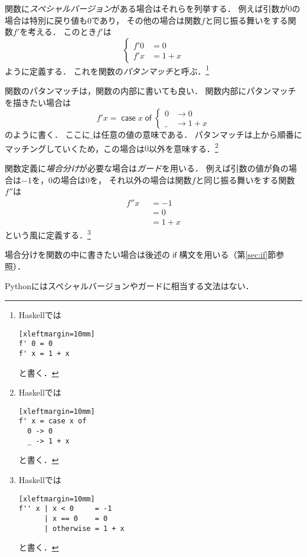 \documentclass[twocolumn]{jsbook}
\newcommand{\programminglanguage}[1]{\textsf{#1}}
\newcommand{\haskell}{\programminglanguage{Haskell}}
\newcommand{\python}{\programminglanguage{Python}}
\newcommand{\keyword}[1]{{\emph{#1}}}
\newcommand{\mathKeyword}[1]{\mathsf{#1}}
\DeclareMathOperator{\mathCaseCase}{\mathKeyword{case}}
\DeclareMathOperator{\mathCaseOf}{\mathKeyword{of}}
\DeclareMathOperator{\mathIf}{\mathKeyword{if}}
\newcommand{\mathOtherwise}{\mathKeyword{otherwise}}
\newcommand{\mathGuard}[1]{\mathop{\mid_{#1}}}
\newcommand{\mathCase}[2]{\mathCaseCase#1\mathCaseOf#2}
\begin{document}
関数に\keyword{スペシャルバージョン}がある場合はそれらを列挙する．
例えば引数が$0$の場合は特別に戻り値も$0$であり，
その他の場合は関数$f$と同じ振る舞いをする関数$f'$を考える．
このとき$f'$は
\begin{equation}
\left\{
\begin{split}
f'0&=0\\
f'x&=1+x
\end{split}
\right.
\end{equation}
ように定義する．
これを関数の\keyword{パタンマッチ}と呼ぶ．\footnote{\haskell では
\begin{verbatim}[xleftmargin=10mm]
f' 0 = 0
f' x = 1 + x
\end{verbatim}
と書く．}

関数のパタンマッチは，関数の内部に書いても良い．
関数内部にパタンマッチを描きたい場合は
\begin{equation}
f'x=\mathCase{x}{\left\{
\begin{split}
0&\rightarrow0\\
\_&\rightarrow1+x
\end{split}
\right.}
\end{equation}
のように書く．
ここに$\_$は任意の値の意味である．
パタンマッチは上から順番にマッチングしていくため，この場合は$0$以外を意味する．\footnote{\haskell では
\begin{verbatim}[xleftmargin=10mm]
f' x = case x of
  0 -> 0
  _ -> 1 + x
\end{verbatim}
と書く．}

関数定義に\keyword{場合分け}が必要な場合は\keyword{ガード}を用いる．
例えば引数の値が負の場合は$-1$を，$0$の場合は$0$を，
それ以外の場合は関数$f$と同じ振る舞いをする関数$f''$は
\begin{equation}
\begin{split}
f''x&\mathGuard{x<0}=-1\\
&\mathGuard{x\equiv 0}=0\\
&\mathGuard{\mathOtherwise}=1+x
\end{split}
\end{equation}
という風に定義する．\footnote{\haskell では
\begin{verbatim}[xleftmargin=10mm]
f'' x | x < 0     = -1
      | x == 0    = 0
      | otherwise = 1 + x
\end{verbatim}
と書く．}

場合分けを関数の中に書きたい場合は後述の$\mathIf$構文を用いる（第\ref{sec:if}節参照）．

\python にはスペシャルバージョンやガードに相当する文法はない．
\end{document}

